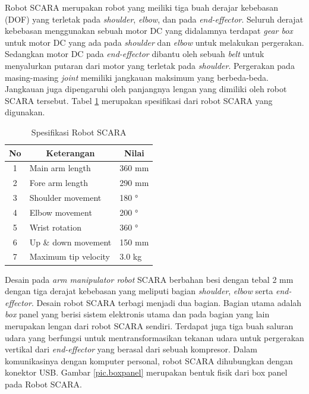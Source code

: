 Robot SCARA merupakan robot yang meiliki tiga buah derajar kebebasan (DOF) yang terletak pada \textit{shoulder}, \textit{elbow}, dan pada \textit{end-effector}. Seluruh derajat kebebasan menggunakan sebuah motor DC yang didalamnya terdapat\textit{ gear box} untuk motor DC yang ada pada \textit{shoulder} dan \textit{elbow} untuk melakukan pergerakan. Sedangkan motor DC pada \textit{end-effector} dibantu oleh sebuah \textit{belt} untuk menyalurkan putaran dari motor yang terletak pada \textit{shoulder}. Pergerakan pada masing-masing \textit{joint} memiliki jangkauan maksimum yang berbeda-beda. Jangkauan juga dipengaruhi oleh panjangnya lengan yang dimiliki oleh robot SCARA tersebut. Tabel \ref{tbl.spesifikasiscara} merupakan spesifikasi dari robot SCARA yang digunakan.

\begin{table}[h]
		\centering
	\caption{Spesifikasi Robot SCARA}
	\label{tbl.spesifikasiscara}
	\begin{tabular}{|c|l|l|}
		\hline
		\rowcolor[HTML]{9B9B9B} 
		No & \multicolumn{1}{c|}{\cellcolor[HTML]{9B9B9B}Keterangan} & \multicolumn{1}{c|}{\cellcolor[HTML]{9B9B9B}Nilai} \\ \hline
		1  & \cellcolor[HTML]{FFFFFF}Main arm length                 & \cellcolor[HTML]{FFFFFF}360 mm                     \\ \hline
		2  & Fore arm length                                         & 290 mm                                             \\ \hline
		3  & Shoulder movement                                       & 180 °                                              \\ \hline
		4  & Elbow movement                                          & 200 °                                              \\ \hline
		5  & Wrist rotation                                          & 360 °                                              \\ \hline
		6  & Up \& down movement                                     & 150 mm                                             \\ \hline
		7  & Maximum tip velocity                                    & 3.0 kg                                             \\ \hline
	\end{tabular}
\end{table}
Desain pada\textit{ arm manipulator robot} SCARA berbahan besi dengan tebal 2 mm dengan tiga derajat kebebasan yang meliputi bagian \textit{shoulder}, \textit{elbow} serta \textit{end-effector}. Desain robot SCARA terbagi menjadi dua bagian. Bagian utama adalah \textit{box} panel yang berisi sistem elektronis utama dan pada bagian yang lain merupakan lengan dari robot SCARA sendiri. Terdapat juga tiga buah saluran udara yang berfungsi untuk mentransformasikan tekanan udara untuk pergerakan vertikal dari \textit{end-effector} yang berasal dari sebuah kompresor.  Dalam komunikasinya dengan komputer personal, robot SCARA dihubungkan dengan konektor USB. Gambar \ref{pic.boxpanel} merupakan bentuk fisik dari box panel pada Robot SCARA.

